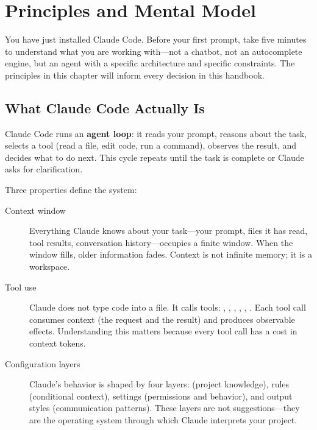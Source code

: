 \chapter{Principles and Mental Model}
\label{ch:principles}

\begin{itshape}
You have just installed Claude Code. Before your first prompt, take five minutes
to understand what you are working with---not a chatbot, not an autocomplete engine,
but an agent with a specific architecture and specific constraints.
The principles in this chapter will inform every decision in this handbook.
\end{itshape}

\section{What Claude Code Actually Is}
\label{sec:mental-model}


Claude Code runs an \textbf{agent loop}: it reads your prompt, reasons about
the task, selects a tool (read a file, edit code, run a command), observes
the result, and decides what to do next. This cycle repeats until the task
is complete or Claude asks for clarification.

Three properties define the system:

\begin{description}
  \item[Context window] Everything Claude knows about your task---your prompt,
    files it has read, tool results, conversation history---occupies a finite
    window. When the window fills, older information fades. Context is not
    infinite memory; it is a workspace.

  \item[Tool use] Claude does not type code into a file. It calls tools:
    , , , , ,
    . Each tool call consumes context (the request and the result)
    and produces observable effects. Understanding this matters because
    every tool call has a cost in context tokens.

  \item[Configuration layers] Claude's behavior is shaped by four layers:
     (project knowledge), rules (conditional context),
    settings (permissions and behavior), and output styles (communication patterns).
    These layers are not suggestions---they are the operating system
    through which Claude interprets your project.
\end{description}

